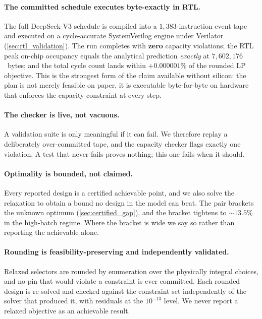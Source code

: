 \paragraph{The committed schedule executes byte-exactly in RTL.}
The full DeepSeek-V3 schedule is compiled into a $1{,}383$-instruction event tape
and executed on a cycle-accurate SystemVerilog engine under Verilator
(\cref{sec:rtl_validation}). The run completes with \textbf{zero} capacity
violations; the RTL peak on-chip occupancy equals the analytical prediction
\emph{exactly} at $7{,}602{,}176$~bytes; and the total cycle count lands within
$+0.000001\%$ of the rounded LP objective. This is the strongest form of the
claim available without silicon: the plan is not merely feasible on paper, it is
executable byte-for-byte on hardware that enforces the capacity constraint at
every step.

\paragraph{The checker is live, not vacuous.}
A validation suite is only meaningful if it can fail. We therefore replay a
deliberately over-committed tape, and the capacity checker flags exactly one
violation. A test that never fails proves nothing; this one fails when it should.

\paragraph{Optimality is bounded, not claimed.}
Every reported design is a certified achievable point, and we also solve the
relaxation to obtain a bound no design in the model can beat. The pair brackets
the unknown optimum (\cref{sec:certified_gap}), and the bracket tightens to
${\sim}13.5\%$ in the high-batch regime. Where the bracket is wide we say so
rather than reporting the achievable alone.

\paragraph{Rounding is feasibility-preserving and independently validated.}
Relaxed selectors are rounded by enumeration over the physically integral
choices, and no pin that would violate a constraint is ever committed. Each
rounded design is re-solved and checked against the constraint set independently
of the solver that produced it, with residuals at the $10^{-13}$ level. We never
report a relaxed objective as an achievable result.

